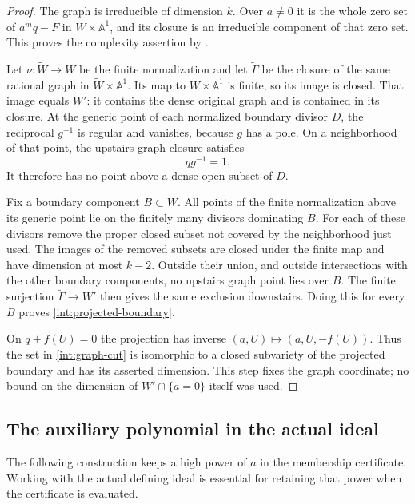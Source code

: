 \begin{proof}
The graph is irreducible of dimension $k$.  Over $a\ne0$ it is the
whole zero set of $a^mq-F$ in $W\times\mathbb A^1$, and its closure
is an irreducible component of that zero set.  This proves the
complexity assertion by .

Let $\nu:\widetilde W\to W$ be the finite normalization and let
$\widetilde\Gamma$ be the closure of the same rational graph in
$\widetilde W\times\mathbb A^1$.  Its map to $W\times\mathbb A^1$
is finite, so its image is closed.  That image equals $W'$: it contains
the dense original graph and is contained in its closure.  At the
generic point of each normalized boundary divisor $D$, the reciprocal
$g^{-1}$ is regular and vanishes, because $g$ has a pole.  On a
neighborhood of that point, the upstairs graph closure satisfies
\[
 qg^{-1}=1.
\]
It therefore has no point above a dense open subset of $D$.

Fix a boundary component $B\subset W$.  All points of the finite
normalization above its generic point lie on the finitely many divisors
dominating $B$.  For each of these divisors remove the proper closed
subset not covered by the neighborhood just used.  The images of the
removed subsets are closed under the finite map and have dimension
at most $k-2$.  Outside their union, and outside intersections with
the other boundary components, no upstairs graph point lies over $B$.
The finite surjection $\widetilde\Gamma\to W'$ then gives the same
exclusion downstairs.  Doing this for every $B$ proves
\eqref{int:projected-boundary}.

On $q+f(U)=0$ the projection has inverse
$(a,U)\mapsto(a,U,-f(U))$.  Thus the set in
\eqref{int:graph-cut} is isomorphic to a closed subvariety of the
projected boundary and has its asserted dimension.  This step fixes
the graph coordinate; no bound on the dimension of
$W'\cap\{a=0\}$ itself was used.
\end{proof}

\subsection{The auxiliary polynomial in the actual ideal}

The following construction keeps a high power of $a$ in the membership
certificate.  Working with the actual defining ideal is essential for
retaining that power when the certificate is evaluated.

